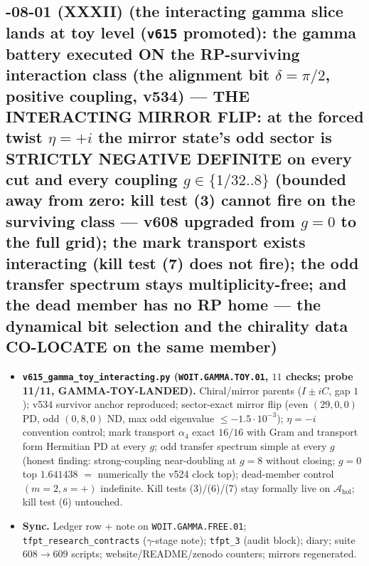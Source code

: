 \subsection*{-08-01 (XXXII) (the interacting gamma slice lands at toy level (\texttt{v615} promoted): the gamma battery executed ON the RP-surviving interaction class (the alignment bit $\delta=\pi/2$, positive coupling, v534) --- THE INTERACTING MIRROR FLIP: at the forced twist $\eta=+i$ the mirror state's odd sector is STRICTLY NEGATIVE DEFINITE on every cut and every coupling $g\in\{1/32..8\}$ (bounded away from zero: kill test (3) cannot fire on the surviving class --- v608 upgraded from $g=0$ to the full grid); the mark transport exists interacting (kill test (7) does not fire); the odd transfer spectrum stays multiplicity-free; and the dead member has no RP home --- the dynamical bit selection and the chirality data CO-LOCATE on the same member)}
\begin{itemize}[leftmargin=1.5em]
\item \textbf{\texttt{v615\_gamma\_toy\_interacting.py} (\texttt{WOIT.GAMMA.TOY.01}, $11$ checks;
probe 11/11, GAMMA-TOY-LANDED).} Chiral/mirror parents ($I\pm iC$, gap $1$); v534 survivor
anchor reproduced; sector-exact mirror flip (even $(29,0,0)$ PD, odd $(0,8,0)$ ND, max odd
eigenvalue $\le-1.5\cdot10^{-3}$); $\eta=-i$ convention control; mark transport
$\alpha_4$ exact $16/16$ with Gram and transport form Hermitian PD at every $g$;
odd transfer spectrum simple at every $g$ (honest finding: strong-coupling near-doubling
at $g=8$ without closing; $g=0$ top $1.641438$ $=$ numerically the v524 clock top);
dead-member control $(m{=}2,s{=}+)$ indefinite.  Kill tests (3)/(6)/(7) stay formally
live on $\mathcal A_{\mathrm{hol}}$; kill test (6) untouched.
\item \textbf{Sync.} Ledger row + note on \texttt{WOIT.GAMMA.FREE.01};
\texttt{tfpt\_research\_contracts} ($\gamma$-stage note); \texttt{tfpt\_3} (audit block);
diary; suite $608\to609$ scripts; website/README/zenodo counters; mirrors regenerated.
\end{itemize}

